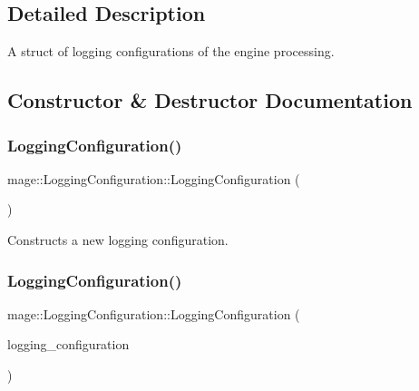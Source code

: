 \subsection{Detailed Description}
A struct of logging configurations of the engine processing. 

\subsection{Constructor \& Destructor Documentation}
\hypertarget{structmage_1_1_logging_configuration_a3d397c3ce26c1c42c9ae4a391391c6f9}{}\label{structmage_1_1_logging_configuration_a3d397c3ce26c1c42c9ae4a391391c6f9} 
\subsubsection{\texorpdfstring{Logging\+Configuration()}{LoggingConfiguration()}\hspace{0.1cm}{\footnotesize\ttfamily [1/2]}}
{\footnotesize\ttfamily mage\+::\+Logging\+Configuration\+::\+Logging\+Configuration (\begin{DoxyParamCaption}{ }\end{DoxyParamCaption})}

Constructs a new logging configuration. \hypertarget{structmage_1_1_logging_configuration_afd44a8c35f8c2e2f7d75b876ae504b06}{}\label{structmage_1_1_logging_configuration_afd44a8c35f8c2e2f7d75b876ae504b06} 
\subsubsection{\texorpdfstring{Logging\+Configuration()}{LoggingConfiguration()}\hspace{0.1cm}{\footnotesize\ttfamily [2/2]}}
{\footnotesize\ttfamily mage\+::\+Logging\+Configuration\+::\+Logging\+Configuration (\begin{DoxyParamCaption}\item[{const \hyperlink{structmage_1_1_logging_configuration}{Logging\+Configuration} \&}]{logging\+\_\+configuration }\end{DoxyParamCaption})}


